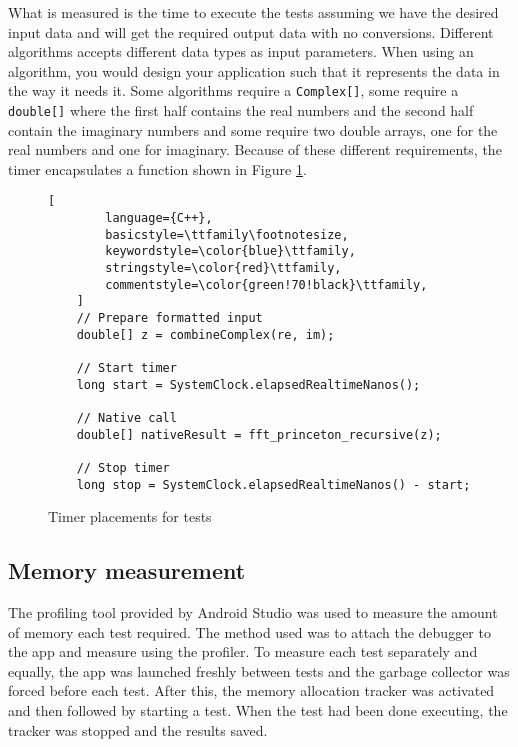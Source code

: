 What is measured is the time to execute the tests assuming we have the desired input data and will get the required output data with no conversions. Different algorithms accepts different data types as input parameters. When using an algorithm, you would design your application such that it represents the data in the way it needs it. Some algorithms require a \texttt{Complex[]}, some require a \texttt{double[]} where the first half contains the real numbers and the second half contain the imaginary numbers and some require two double arrays, one for the real numbers and one for imaginary. Because of these different requirements, the timer encapsulates a function shown in Figure \ref{fig:timer:pos}.

\begin{figure}
\begin{lstlisting}[
        language={C++},
        basicstyle=\ttfamily\footnotesize,
        keywordstyle=\color{blue}\ttfamily,
        stringstyle=\color{red}\ttfamily,
        commentstyle=\color{green!70!black}\ttfamily,
    ]
    // Prepare formatted input
    double[] z = combineComplex(re, im);

    // Start timer
    long start = SystemClock.elapsedRealtimeNanos();

    // Native call
    double[] nativeResult = fft_princeton_recursive(z);

    // Stop timer
    long stop = SystemClock.elapsedRealtimeNanos() - start;
\end{lstlisting}
\caption{Timer placements for tests}
\label{fig:timer:pos}
\end{figure}


\subsection{Memory measurement}
The profiling tool provided by Android Studio was used to measure the amount of memory each test required. The method used was to attach the debugger to the app and measure using the profiler. To measure each test separately and equally, the app was launched freshly between tests and the garbage collector was forced before each test. After this, the memory allocation tracker was activated and then followed by starting a test. When the test had been done executing, the tracker was stopped and the results saved.

